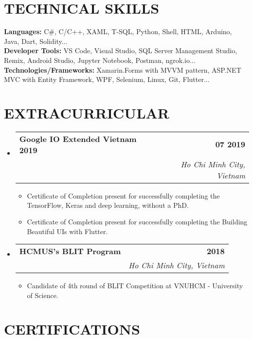 \documentclass[letterpaper,11pt]{article}
\makeatletter
\newcommand{\resumeItem}[1]{
  \item\small{
    {#1 \vspace{-2pt}}
  }
}
\newcommand{\resumeSubheading}[4]{
  \vspace{-2pt}\item
    \begin{tabular*}{1.0\textwidth}[t]{l@{\extracolsep{\fill}}r}
      \textbf{\large#1} & \textbf{\small #2} \\
      \textit{\large#3} & \textit{\small #4} \\
      
    \end{tabular*}\vspace{-7pt}
}
\newcommand{\resumeSubHeadingListStart}{\begin{itemize}[leftmargin=0.0in, label={}]}
\newcommand{\resumeSubHeadingListEnd}{\end{itemize}}
\newcommand{\resumeItemListStart}{\begin{itemize}}
\newcommand{\resumeItemListEnd}{\end{itemize}\vspace{-5pt}}
\makeatother
\begin{document}
\section{TECHNICAL SKILLS}
 \begin{itemize}[leftmargin=0.15in, label={}]
    \small{\item{
     \textbf{\normalsize{Languages:}}{ \normalsize{C\#, C/C++, XAML, T-SQL, Python, Shell, HTML, Arduino, Java, Dart, Solidity...}} \\
     \textbf{\normalsize{Developer Tools:}}{ \normalsize{VS Code, Visual Studio, SQL Server Management Studio, Remix, Android Studio, Jupyter Notebook, Postman, ngrok.io...}} \\
     \textbf{\normalsize{Technologies/Frameworks:}}{\normalsize{ Xamarin.Forms with MVVM pattern, ASP.NET MVC with Entity Framework, WPF, Selenium, Linux, Git, Flutter...}} \\
    }}
 \end{itemize}
 \vspace{-15pt}


\section{EXTRACURRICULAR}
    \resumeSubHeadingListStart
        \resumeSubheading{Google IO Extended Vietnam 2019 \href{https://drive.google.com/drive/folders/1k5h6xw7oFICgEAcnXmVP1wcZdPf8Fa5k?usp=sharing}{\raisebox{-0.1\height}\faExternalLink } }{07 2019}
        {}{Ho Chi Minh City, Vietnam}
            \resumeItemListStart
                \resumeItem{\normalsize{Certificate of Completion present for successfully completing the TensorFlow, Keras and deep learning, without a PhD.}}
                \resumeItem{\normalsize{Certificate of Completion present for successfully completing the Building Beautiful UIs with Flutter.}}
            \resumeItemListEnd

        \resumeSubheading{HCMUS's BLIT Program}{2018}
        {}{Ho Chi Minh City, Vietnam}
            \resumeItemListStart
                \resumeItem{\normalsize{Candidate of 4th round of BLIT Competition at VNUHCM - University of Science.}}
            \resumeItemListEnd
    \resumeSubHeadingListEnd
 \vspace{-11pt}
 
\section{CERTIFICATIONS}
\end{document}
